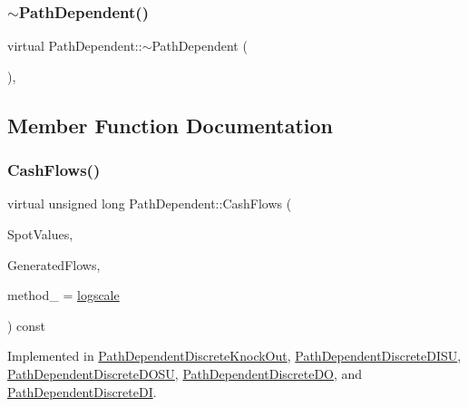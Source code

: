 \hypertarget{classPathDependent_af508f6b23ecba8fcf7d4a1dd90a7a7f8}{}\label{classPathDependent_af508f6b23ecba8fcf7d4a1dd90a7a7f8} 
\subsubsection{\texorpdfstring{$\sim$\+Path\+Dependent()}{~PathDependent()}}
{\footnotesize\ttfamily virtual Path\+Dependent\+::$\sim$\+Path\+Dependent (\begin{DoxyParamCaption}{ }\end{DoxyParamCaption})\hspace{0.3cm}{\ttfamily [inline]}, {\ttfamily [virtual]}}



\subsection{Member Function Documentation}
\hypertarget{classPathDependent_a5d5b1d6ecf9dc6be128fff9694f589c8}{}\label{classPathDependent_a5d5b1d6ecf9dc6be128fff9694f589c8} 
\subsubsection{\texorpdfstring{Cash\+Flows()}{CashFlows()}}
{\footnotesize\ttfamily virtual unsigned long Path\+Dependent\+::\+Cash\+Flows (\begin{DoxyParamCaption}\item[{const \hyperlink{classMJArray}{M\+J\+Array} \&}]{Spot\+Values,  }\item[{std\+::vector$<$ \hyperlink{classMyCashFlow_1_1CashFlow}{My\+Cash\+Flow\+::\+Cash\+Flow} $>$ \&}]{Generated\+Flows,  }\item[{\hyperlink{PathDependent_8h_abed946c62f140eb7ff2ac742e6ad9497}{method}}]{method\+\_\+ = {\ttfamily \hyperlink{PathDependent_8h_abed946c62f140eb7ff2ac742e6ad9497a064d3d3358889658ce07fe9f3191d1fd}{logscale}} }\end{DoxyParamCaption}) const\hspace{0.3cm}{\ttfamily [pure virtual]}}



Implemented in \hyperlink{classPathDependentDiscreteKnockOut_a7417c5e52e5f9140f1616fd5019a9eb3}{Path\+Dependent\+Discrete\+Knock\+Out}, \hyperlink{classPathDependentDiscreteDISU_ae2b805e66651705392b95f57acc08fff}{Path\+Dependent\+Discrete\+D\+I\+SU}, \hyperlink{classPathDependentDiscreteDOSU_a727544f701f7b950d52c36584c9cc006}{Path\+Dependent\+Discrete\+D\+O\+SU}, \hyperlink{classPathDependentDiscreteDO_aaf15433cd3271c6af5cacf91ac154811}{Path\+Dependent\+Discrete\+DO}, and \hyperlink{classPathDependentDiscreteDI_a42183f0f6276fedf39a9314009d8846c}{Path\+Dependent\+Discrete\+DI}.

